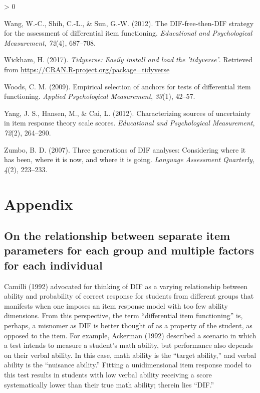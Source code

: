 \documentclass[
  english,
  man,floatsintext]{apa6}
\newlength{\cslhangindent}
\newenvironment{CSLReferences}[2] %
 {%
  \setlength{\parindent}{0pt}
  \ifodd #1 \everypar{\setlength{\hangindent}{\cslhangindent}}\ignorespaces\fi
  \ifnum #2 > 0
  \setlength{\parskip}{#2\baselineskip}
  \fi
 }%
 {}
\begin{document}
\begin{CSLReferences}{1}{0}
\leavevmode\hypertarget{ref-wang2012dif}{}%
Wang, W.-C., Shih, C.-L., \& Sun, G.-W. (2012). The DIF-free-then-DIF strategy for the assessment of differential item functioning. \emph{Educational and Psychological Measurement}, \emph{72}(4), 687--708.

\leavevmode\hypertarget{ref-tidy}{}%
Wickham, H. (2017). \emph{Tidyverse: Easily install and load the 'tidyverse'}. Retrieved from \url{https://CRAN.R-project.org/package=tidyverse}

\leavevmode\hypertarget{ref-woods2009empirical}{}%
Woods, C. M. (2009). Empirical selection of anchors for tests of differential item functioning. \emph{Applied Psychological Measurement}, \emph{33}(1), 42--57.

\leavevmode\hypertarget{ref-yang2012characterizing}{}%
Yang, J. S., Hansen, M., \& Cai, L. (2012). Characterizing sources of uncertainty in item response theory scale scores. \emph{Educational and Psychological Measurement}, \emph{72}(2), 264--290.

\leavevmode\hypertarget{ref-zumbo2007three}{}%
Zumbo, B. D. (2007). Three generations of DIF analyses: Considering where it has been, where it is now, and where it is going. \emph{Language Assessment Quarterly}, \emph{4}(2), 223--233.

\end{CSLReferences}

\endgroup

\clearpage

\hypertarget{appendix}{%
\section{Appendix}\label{appendix}}

\hypertarget{on-the-relationship-between-separate-item-parameters-for-each-group-and-multiple-factors-for-each-individual}{%
\subsection{On the relationship between separate item parameters for each group and multiple factors for each individual}\label{on-the-relationship-between-separate-item-parameters-for-each-group-and-multiple-factors-for-each-individual}}

Camilli (1992) advocated for thinking of DIF as a varying relationship between ability and probability of correct response for students from different groups that manifests when one imposes an item response model with too few ability dimensions. From this perspective, the term ``differential item functioning'' is, perhaps, a misnomer as DIF is better thought of as a property of the student, as opposed to the item. For example, Ackerman (1992) described a scenario in which a test intends to measure a student's math ability, but performance also depends on their verbal ability. In this case, math ability is the ``target ability,'' and verbal ability is the ``nuisance ability.'' Fitting a unidimensional item response model to this test results in students with low verbal ability receiving a score systematically lower than their true math ability; therein lies ``DIF.''
\end{document}
